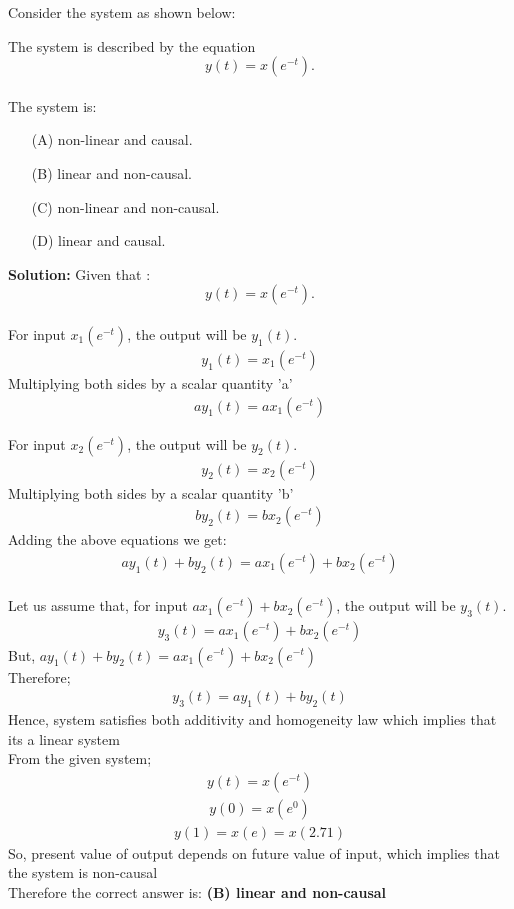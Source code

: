 \documentclass{article}
\begin{document}
Consider the system as shown below:


The system is described by the equation
\[ y(t) = x(e^{-t}). \]\\
The system is:
\begin{itemize}
    \item[(A)] non-linear and causal.
    \item[(B)] linear and non-causal.
    \item[(C)] non-linear and non-causal.
    \item[(D)] linear and causal.
\end{itemize}
\textbf{Solution:}
 Given that : \[ y(t) = x(e^{-t}). \]\\
For input \(x_1(e^{-t})\), the output will be \(y_1(t)\).
 \begin{align}
 y_1(t) = x_1(e^{-t})
 \end{align}
Multiplying both sides by a scalar quantity 'a'
 \begin{align}
 ay_1(t) = ax_1(e^{-t})
 \end{align}
 
For input \(x_2(e^{-t})\), the output will be \(y_2(t)\).
 \begin{align}
 y_2(t) = x_2(e^{-t})
 \end{align}
Multiplying both sides by a scalar quantity 'b'
 \begin{align}
 by_2(t) = bx_2(e^{-t})
 \end{align}
 Adding the above equations we get:
 \begin{align}
 ay_1(t) + by_2(t) = ax_1(e^{-t}) + bx_2(e^{-t})
 \end{align}
\\Let us assume that, for input \(ax_1(e^{-t}) + bx_2(e^{-t})\), the output will be \(y_3(t)\).
\begin{align}
 y_3(t) = ax_1(e^{-t}) + bx_2(e^{-t})
\end{align}
 But, \(ay_1(t) + by_2(t) = ax_1(e^{-t}) + bx_2(e^{-t})\)\\Therefore;
\begin{align}
 y_3(t) = ay_1(t) + by_2(t)
\end{align}
Hence, system satisfies both additivity and homogeneity law which implies that its a linear system\\
From the given system;
\begin{align}
 y(t) = x(e^{-t})
  \end{align}
 \begin{align}
 y(0) = x(e^{0})
  \end{align}
 \begin{align}
 y(1) = x(e)=x(2.71)
 \end{align}
 So, present value of output depends on future value of input, which implies that the system is non-causal\\
 Therefore the correct answer is:
 \textbf{(B) linear and non-causal}
 
\end{document}
